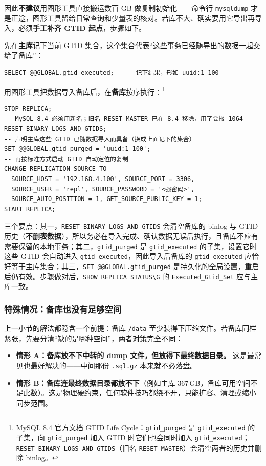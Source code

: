 \documentclass[12pt,UTF8]{ctexbook}
\begin{document}
因此\textbf{不建议}用图形工具直接搬运数百 GB 做复制初始化——命令行 \texttt{mysqldump} 才是正途，图形工具留给日常查询和少量表的核对。若库不大、确实要用它导出再导入，必须\textbf{手工补齐 GTID 起点}，步骤如下。

先在\textbf{主库}记下当前 GTID 集合，这个集合代表“这些事务已经随导出的数据一起交给了备库”：

\begin{lstlisting}
SELECT @@GLOBAL.gtid_executed;   -- 记下结果，形如 uuid:1-100
\end{lstlisting}

用图形工具把数据导入备库后，在\textbf{备库}按序执行：\footnote{MySQL 8.4 官方文档 GTID Life Cycle：\texttt{gtid\_purged} 是 \texttt{gtid\_executed} 的子集，向 \texttt{gtid\_purged} 加入 GTID 时它们也会同时加入 \texttt{gtid\_executed}；\texttt{RESET BINARY LOGS AND GTIDS}（旧名 \texttt{RESET MASTER}）会清空两者的历史并删除 binlog。}

\begin{lstlisting}
STOP REPLICA;
-- MySQL 8.4 必须用新名；旧名 RESET MASTER 已在 8.4 移除，用了会报 1064
RESET BINARY LOGS AND GTIDS;
-- 声明主库这些 GTID 已随数据导入而具备（换成上面记下的集合）
SET @@GLOBAL.gtid_purged = 'uuid:1-100';
-- 再按标准方式启动 GTID 自动定位的复制
CHANGE REPLICATION SOURCE TO
  SOURCE_HOST = '192.168.4.100', SOURCE_PORT = 3306,
  SOURCE_USER = 'repl', SOURCE_PASSWORD = '<强密码>',
  SOURCE_AUTO_POSITION = 1, GET_SOURCE_PUBLIC_KEY = 1;
START REPLICA;
\end{lstlisting}

三个要点：其一，\texttt{RESET BINARY LOGS AND GTIDS} 会清空备库的 binlog 与 GTID 历史（\textbf{不删表数据}），所以务必在导入完成、确认数据无误后执行，且备库不应有需要保留的本地事务；其二，\texttt{gtid\_purged} 是 \texttt{gtid\_executed} 的子集，设置它时这些 GTID 会自动进入 \texttt{gtid\_executed}，因此导入后备库的 \texttt{gtid\_executed} 应恰好等于主库集合；其三，\texttt{SET @@GLOBAL.gtid\_purged} 是持久化的全局设置，重启后仍有效。步骤做对后，\texttt{SHOW REPLICA STATUS\textbackslash{}G} 的 \texttt{Executed\_Gtid\_Set} 应与主库一致。

\subsubsection{特殊情况：备库也没有足够空间}

上一小节的解法都隐含一个前提：备库 \texttt{/data} 至少装得下压缩文件。若备库同样紧张，先要分清“缺的是哪种空间”，两者对策完全不同：

\begin{itemize}[leftmargin=2cm]
  \item \textbf{情形 A：备库放不下中转的 dump 文件，但放得下最终数据目录。} 这是最常见也最好解决的——中间那份 \texttt{.sql.gz} 本来就不必落盘。
  \item \textbf{情形 B：备库连最终数据目录都放不下}（例如主库 367\,GB，备库可用空间不足此数）。这是物理硬约束，任何软件技巧都绕不开，只能扩容、清理或缩小同步范围。
\end{itemize}
\end{document}
